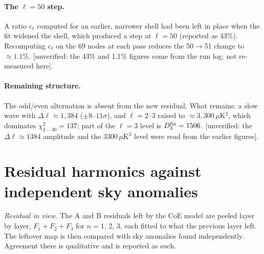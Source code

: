 \documentclass[10pt,twocolumn]{article}
\newcommand{\flag}[1]{\textsf{[unverified: #1]}}
\begin{document}
\paragraph{The $\ell=50$ step.} A ratio $c_\ell$ computed for an earlier, narrower shell had been left in place when the fit widened the shell, which produced a step at $\ell=50$ (reported as 43\%). Recomputing $c_\ell$ on the 69 nodes at each pass reduces the 50$\to$51 change to $\approx1.1\%$. \flag{the 43\% and 1.1\% figures come from the run log; not re-measured here}.
\paragraph{Remaining structure.} The odd/even alternation is absent from the new residual. What remains: a slow wave with $\Delta\ell\approx1{,}384$ ($\pm8$--$11\sigma$), and $\ell=2$--3 raised to $\approx3{,}300\,\mu$K$^2$, which dominates $\chi^2_{2-30}=137$; part of the $\ell=3$ level is $D^{\rm fix}_3=1506$. \flag{the $\Delta\ell\approx1384$ amplitude and the 3300\,$\mu$K$^2$ level were read from the earlier figures}.

\section{Residual harmonics against independent sky anomalies}\label{sec:skyres}
\noindent\emph{Residual in view.} The A and B residuals left by the CoE model are peeled layer by layer, $F_1+F_2+F_3$ for $n=1$, 2, 3, each fitted to what the previous layer left. The leftover map is then compared with sky anomalies found independently. Agreement there is qualitative and is reported as such.
\end{document}
